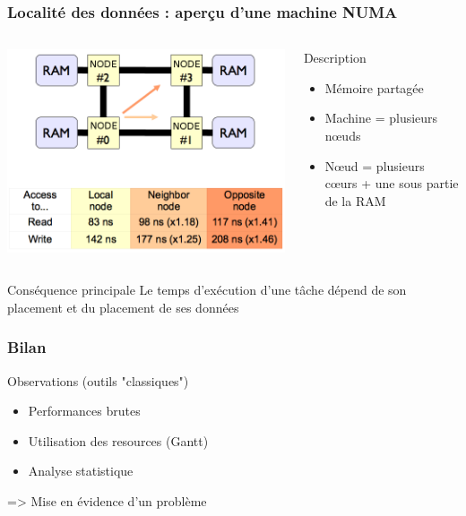 \documentclass[xcolor={usenames,dvipsnames,svgnames,table}, aspectratio=43]{beamer}
\begin{document}
\begin{frame}
\frametitle{Localité des données : aperçu d'une machine NUMA}
\begin{columns}[T,onlytextwidth]
  \includegraphics[scale=0.3]{graph/NUMA-latences}

  \begin{block}{Description}
    \begin{itemize}
      \item Mémoire partagée
      \item Machine = plusieurs nœuds
      \item Nœud = plusieurs cœurs + une sous partie de la RAM
    \end{itemize}
  \end{block}

\end{columns}
\begin{alertblock}{Conséquence principale}
  Le temps d'exécution d'une tâche dépend de son placement et du placement de ses données
\end{alertblock}

\end{frame}

\begin{frame}
  \frametitle{Bilan}

  \begin{block}{Observations (outils "classiques")}
    \begin{itemize}
      \item Performances brutes
      \item Utilisation des resources (Gantt)
      \item Analyse statistique
    \end{itemize}
    => Mise en évidence d'un problème
  \end{block}
\end{frame}
\end{document}
